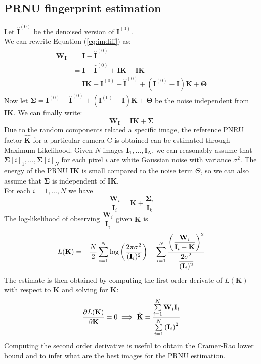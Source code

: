 \documentclass[a4paper, 12pt]{article}
\begin{document}
\subsection*{PRNU fingerprint estimation}
Let $ \mathbf{\hat{I}}^{(0)}$ be the denoised version of $\mathbf{I}^{(0)}$.\\
We can rewrite Equation (\ref{eq:imdiff}) as:
\begin{align}
\mathbf{W_I} & = \mathbf{I}- \mathbf{\hat{I}}^{(0)} \nonumber \\
& = \mathbf{I}- \mathbf{\hat{I}}^{(0)} + \mathbf{I} \mathbf{K} - \mathbf{I} \mathbf{K} \nonumber \\
& = \mathbf{I} \mathbf{K} + \mathbf{I}^{(0)} - \mathbf{\hat{I}}^{(0)} + \left( \mathbf{I}^{(0)}-\mathbf{I} \right) \mathbf{K} + \mathbf{\Theta}
\end{align}
Now let $\mathbf{\Sigma} = \mathbf{I}^{(0)} - \mathbf{\hat{I}}^{(0)} + \left( \mathbf{I}^{(0)}-\mathbf{I} \right) \mathbf{K} + \mathbf{\Theta}$ be the noise independent from $\mathbf{IK}$. We can finally write:
\begin{equation}
\mathbf{W_I} = \mathbf{I} \mathbf{K} + \mathbf{\Sigma}
\end{equation}
Due to the random components related a specific image, the reference PNRU factor $\mathbf{\hat{K}}$ for a particular camera C is obtained can be estimated through Maximum Likelihood.
Given $N$ images $\mathbf{I}_1, \dots, \mathbf{I}_N$, we can reasonably assume that $\mathbf{\Sigma}[i]_1, \dots, \mathbf{\Sigma}[i]_N$ for each pixel $i$ are white Gaussian noise with variance $\sigma^2$. The energy of the PRNU $\mathbf{I} \mathbf{K}$ is small compared to the noise term $\Theta$, so we can also assume that $\mathbf{\Sigma}$ is independent of $\mathbf{I} \mathbf{K}$.\\
For each $i=1,\dots,N$ we have
\begin{equation*}
\dfrac{\mathbf{W}_i}{\mathbf{I}_i} = \mathbf{K} + \dfrac{\mathbf{\Sigma}_i}{\mathbf{I}_k}
\end{equation*}
The log-likelihood of observing $\dfrac{\mathbf{W}_i}{\mathbf{I}_i}$ given $\mathbf{K}$ is
\begin{equation}
L(\mathbf{K}) =-\dfrac{N}{2} \sum_{i=1}^{N}\log\left( \dfrac{2\pi\sigma^{2}}{({\bf I}_{i})^{2}}\right)-\sum_{i=1}^{N}{ \frac{\left(\dfrac{{\bf W}_{i}}{{\mathbf I}_{i}-{\bf K}}\right)^{2}}{\dfrac{2\sigma^{2}}{({\mathbf I}_{i})^{2}}}}
\end{equation}
The estimate is then obtained by computing the first order derivate of $L(\mathbf{K})$ with respect to $\mathbf{K}$ and solving for $\mathbf{K}$:
\begin{equation*}
\dfrac{\partial L(\mathbf{K})}{\partial{\bf K}} = 0 \implies \mathbf{\hat{K}} = \dfrac{\sum\limits_{i=1}^{N} \mathbf{W}_i \mathbf{I}_i}{\sum\limits_{i=1}^{N} \left( \mathbf{I}_i \right) ^2}
\end{equation*}
Computing the second order derivative is useful to obtain the Cramer-Rao lower bound and to infer what are the best images for the PRNU estimation.
\end{document}

